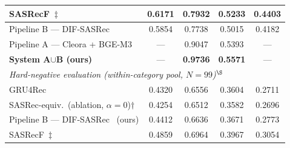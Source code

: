 \begin{table}[ht]
\begin{tabular}{lcccc}
SASRecF~\cite{kang2018self}$\ddagger$    & 0.6171 & 0.7932 & 0.5233 & 0.4403 \\
\hline
Pipeline B --- DIF-SASRec~\cite{xie2022difsasrec} & 0.5854 & 0.7738 & 0.5015 & 0.4182 \\
Pipeline A --- Cleora + BGE-M3            & ---      & 0.9047 & 0.5393 & ---      \\
\textbf{System A$\cup$B (ours)}         & ---      & \textbf{0.9736} & \textbf{0.5571} & --- \\
\hline
\multicolumn{5}{l}{\textit{Hard-negative evaluation (within-category pool, $N{=}99$)$^\S$}} \\
\hline
GRU4Rec~\cite{hidasi2016gru4rec}                          & 0.4320 & 0.6556 & 0.3604 & 0.2711 \\
SASRec-equiv.~(ablation, $\alpha{=}0$)$\dagger$           & 0.4254 & 0.6512 & 0.3582 & 0.2696 \\
Pipeline B --- DIF-SASRec~\cite{xie2022difsasrec} (ours) & 0.4412 & 0.6636 & 0.3671 & 0.2773 \\
SASRecF~\cite{kang2018self}$\ddagger$                     & 0.4859 & 0.6964 & 0.3967 & 0.3054 \\
\hline
\end{tabular}
\end{table}
